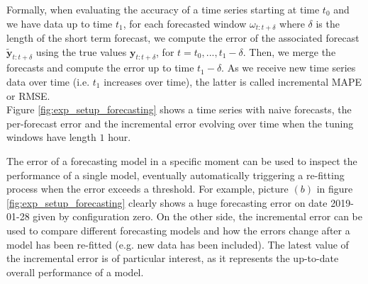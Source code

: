 \documentclass[a4paper, 12pt]{article} %
\begin{document}
	Formally, when evaluating the accuracy of a time series starting at time $t_0$ and we have data up to time $t_1$, for each forecasted window $\omega_{t:t+\delta}$ where $\delta$ is the length of the short term forecast, we compute the error of the associated forecast $\tilde{\pmb{y}}_{t:t+\delta}$ using the true values $\pmb{y}_{t:t+\delta}$, for $t=t_0, ..., t_1 - \delta$. Then, we merge the forecasts and compute the error up to time $t_1 - \delta$. As we receive new time series data over time (i.e. $t_1$ increases over time), the latter is called incremental MAPE or RMSE. \\
	Figure \ref{fig:exp_setup_forecasting} shows a time series with naive forecasts, the per-forecast error and the incremental error evolving over time when the tuning windows have length $1$ hour.
	
	The error of a forecasting model in a specific moment can be used to inspect the performance of a single model, eventually automatically triggering a re-fitting process when the error exceeds a threshold. For example, picture $(b)$ in figure \ref{fig:exp_setup_forecasting} clearly shows a huge forecasting error on date 2019-01-28 given by configuration zero. On the other side, the incremental error can be used to compare different forecasting models and how the errors change after a model has been re-fitted (e.g. new data has been included). The latest value of the incremental error is of particular interest, as it represents the up-to-date overall performance of a model.
	
\end{document}
